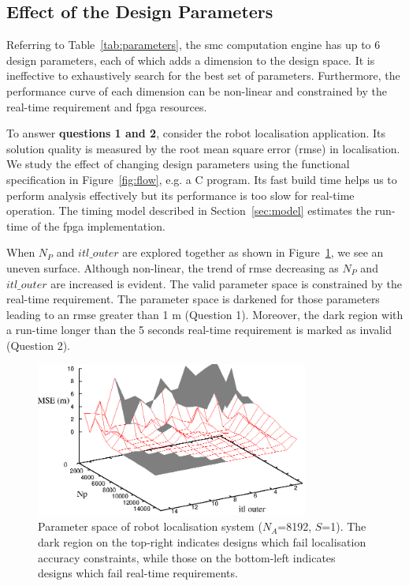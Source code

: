 \subsection{Effect of the Design Parameters}
\label{sec:parameters}

Referring to Table~\ref{tab:parameters}, the \gls{smc} computation engine has up to 6 design parameters, each of which adds a dimension to the design space.
It is ineffective to exhaustively search for the best set of parameters.
Furthermore, the performance curve of each dimension can be non-linear and constrained by the real-time requirement and \gls{fpga} resources.

To answer \textbf{questions 1 and 2}, consider the robot localisation application.
Its solution quality is measured by the root mean square error (\gls{rmse}) in localisation.
We study the effect of changing design parameters using the functional specification in Figure~\ref{fig:flow}, e.g. a C program.
Its fast build time helps us to perform analysis effectively but its performance is too slow for real-time operation.
The timing model described in Section~\ref{sec:model} estimates the run-time of the \gls{fpga} implementation.

When $N_P$ and $itl\_outer$ are explored together as shown in Figure~\ref{fig:mcl_2d}, we see an uneven surface.
Although non-linear, the trend of  \gls{rmse} decreasing as $N_P$ and $itl\_outer$ are increased is evident.
The valid parameter space is constrained by the real-time requirement.
The parameter space is darkened for those parameters leading to an \gls{rmse} greater than 1 m (Question 1).
Moreover, the dark region with a run-time longer than the 5 seconds real-time requirement is marked as invalid (Question 2).

\begin{figure}[t!]
\begin{center}
\includegraphics[width=0.8\textwidth]{design_flow/figures/fig_mcl_2d}
\end{center}
\caption{Parameter space of robot localisation system ($N_A$=8192, $S$=1). The dark region on the top-right indicates designs which fail localisation accuracy constraints, while those on the bottom-left indicates designs which fail real-time requirements.}
\label{fig:mcl_2d}
\end{figure}

